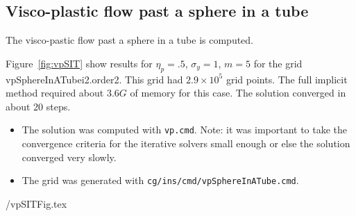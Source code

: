 \clearpage
\subsection{Visco-plastic flow past a sphere in a tube}\label{sec:vpSIT}

The visco-pastic flow past a sphere in a tube is computed. 

Figure~\ref{fig:vpSIT} show results for $\eta_p=.5$, $\sigma_y=1$, $m=5$
for the grid vpSphereInATubei2.order2. This grid had $2.9\times 10^5$ grid points. 
The full implicit method required about $3.6G$ of memory for this case. 
The solution converged in about 20 steps. 

\begin{itemize}
\item The solution was computed with {\tt vp.cmd}. Note: it was important to take the convergence
    criteria for the iterative solvers small enough or else the solution converged very slowly.
\item The grid was generated with {\tt cg/ins/cmd/vpSphereInATube.cmd}.

\end{itemize}

 \vpDir/vpSITFig.tex
